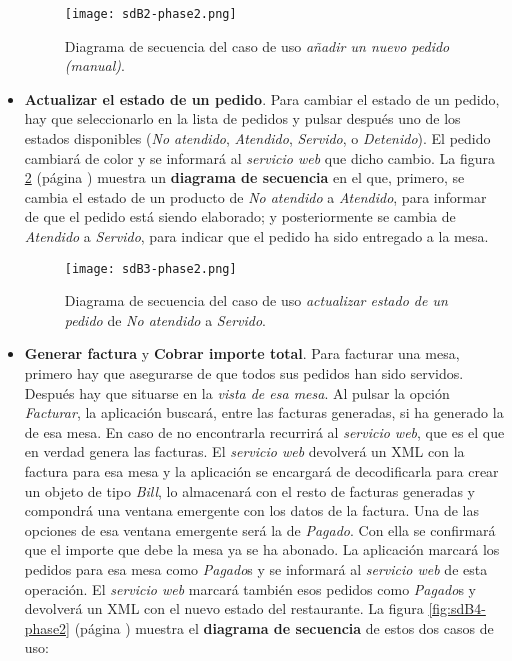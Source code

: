 \begin{itemize}
  \begin{figure}[!h]
    \begin{center}
      \texttt{[image: sdB2-phase2.png]}
      \caption{Diagrama de secuencia del caso de uso \emph{añadir un nuevo
      pedido (manual)}.}
      \label{fig:sdB2-phase2}
    \end{center}
  \end{figure}

\item \textbf{Actualizar el estado de un pedido}. Para cambiar el estado de
un pedido, hay que seleccionarlo en la lista de pedidos y pulsar después uno
de los estados disponibles (\emph{No atendido}, \emph{Atendido},
\emph{Servido}, o \emph{Detenido}). El pedido cambiará de color y se informará
al \emph{servicio web} que dicho cambio.
La figura \ref{fig:sdB3-phase2} (página \pageref{fig:sdB3-phase2}) muestra
un \textbf{diagrama de secuencia} en el que, primero, se cambia el estado de
un producto de \emph{No atendido} a \emph{Atendido}, para informar de que
el pedido está siendo elaborado; y posteriormente se cambia de \emph{Atendido}
a \emph{Servido}, para indicar que el pedido ha sido entregado a la mesa.

  \begin{figure}[!h]
    \begin{center}
      \texttt{[image: sdB3-phase2.png]}
      \caption{Diagrama de secuencia del caso de uso \emph{actualizar
      estado de un pedido} de \emph{No atendido} a \emph{Servido}.}
      \label{fig:sdB3-phase2}
    \end{center}
  \end{figure}

\item \textbf{Generar factura} y  \textbf{Cobrar importe total}. Para
facturar una mesa, primero hay que asegurarse de que todos sus pedidos han
sido servidos. Después hay que situarse en la \emph{vista de esa mesa}.
Al pulsar la opción \emph{Facturar}, la aplicación buscará, entre las facturas
generadas, si ha generado la de esa mesa. En caso de no encontrarla recurrirá
al \emph{servicio web}, que es el que en verdad genera las facturas. El
\emph{servicio web} devolverá un \acs{XML} con la factura para esa mesa y la 
aplicación se encargará de decodificarla para crear un objeto de tipo
\emph{Bill}, lo almacenará con el resto de facturas generadas y compondrá
una ventana emergente con los datos de la factura. Una de las opciones de
esa ventana emergente será la de \emph{Pagado}. Con ella se confirmará que
el importe que debe la mesa ya se ha abonado. La aplicación marcará los
pedidos para esa mesa como \emph{Pagado}s y se informará al \emph{servicio
web} de esta operación. El \emph{servicio web} marcará también esos pedidos
como \emph{Pagado}s y devolverá un \acs{XML} con el nuevo estado del
restaurante. La figura \ref{fig:sdB4-phase2} (página \pageref{fig:sdB4-phase2})
muestra el \textbf{diagrama de secuencia} de estos dos casos de uso:


\end{itemize}
